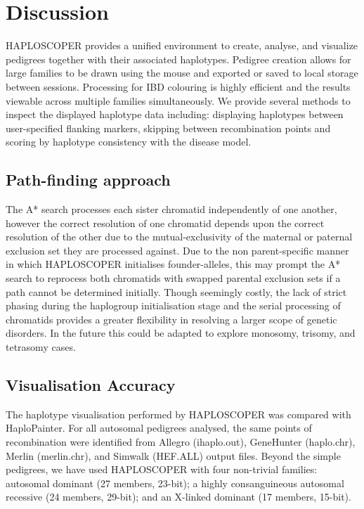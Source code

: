 \documentclass{assets/biotemplate/bioinfo}
\numberwithin{equation}{section}
\def\haplo{{HAPLOSCOPER}}            %
\def\hpainter{{HaploPainter}}
\begin{document}
\section{Discussion}

\haplo{} provides a unified environment to create, analyse, and visualize pedigrees together with their associated haplotypes. Pedigree creation allows for large families to be drawn using the mouse and exported or saved to local storage between sessions. Processing for IBD colouring is highly efficient and the results viewable across multiple families simultaneously. We provide several methods to inspect the displayed haplotype data including: displaying haplotypes between user-specified flanking markers, skipping between recombination points and scoring by haplotype consistency with the disease model.

\subsection{Path-finding approach}


The A* search processes each sister chromatid independently of one another, however the correct resolution of one chromatid depends upon the correct resolution of the other due to the mutual-exclusivity of the maternal or paternal exclusion set they are processed against. Due to the non parent-specific manner in which \haplo{} initialises founder-alleles, this may prompt the A* search to reprocess both chromatids with swapped parental exclusion sets if a path cannot be determined initially. 
Though seemingly costly, the lack of strict phasing during the haplogroup initialisation stage and the serial processing of chromatids provides a greater flexibility in resolving a larger scope of genetic disorders. 
In the future this could be adapted to explore monosomy, trisomy, and tetrasomy cases.


\subsection{Visualisation Accuracy}

The haplotype visualisation performed by \haplo{} was compared with \hpainter{}. For all autosomal pedigrees analysed, the same points of recombination were identified from Allegro (ihaplo.out), GeneHunter (haplo.chr), Merlin (merlin.chr), and Simwalk (HEF.ALL) output files. Beyond the simple pedigrees, we have used \haplo{} with four non-trivial families: autosomal dominant (27 members, 23-bit); a highly consanguineous autosomal recessive (24 members, 29-bit); and an X-linked dominant (17 members, 15-bit).
\end{document}
